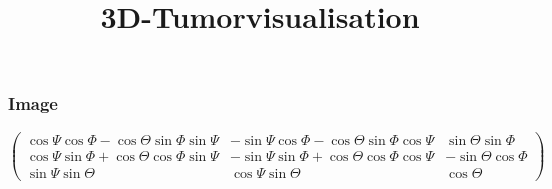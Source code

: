 \documentclass{beamer}
\title{3D-Tumorvisualisation}
\begin{document}
\begin{frame}
\titlepage
\end{frame}
\begin{frame}
   \frametitle{Image}
   $\begin{pmatrix}\cos\Psi\cos\Phi - \cos\Theta\sin\Phi\sin\Psi & -\sin\Psi\cos\Phi - \cos\Theta\sin\Phi\cos\Psi & \sin\Theta\sin\Phi\\\cos\Psi\sin\Phi + \cos\Theta\cos\Phi\sin\Psi & -\sin\Psi\sin\Phi + \cos\Theta\cos\Phi\cos\Psi & -\sin\Theta\cos\Phi\\\sin\Psi\sin\Theta & \cos\Psi\sin\Theta & \cos\Theta\end{pmatrix}$
\end{frame}
\end{document}
